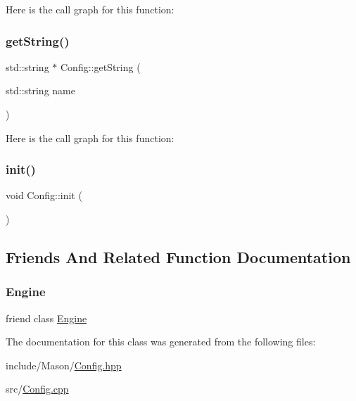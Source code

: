 Here is the call graph for this function\+:
\hypertarget{class_mason_1_1_config_abc367cc6194d049807fab3ff684996e3}{}\label{class_mason_1_1_config_abc367cc6194d049807fab3ff684996e3} 
\subsubsection{\texorpdfstring{get\+String()}{getString()}}
{\footnotesize\ttfamily std\+::string $\ast$ Config\+::get\+String (\begin{DoxyParamCaption}\item[{std\+::string}]{name }\end{DoxyParamCaption})\hspace{0.3cm}{\ttfamily [static]}}

Here is the call graph for this function\+:
\hypertarget{class_mason_1_1_config_a91bcb187ed95ec673137e413a4d77203}{}\label{class_mason_1_1_config_a91bcb187ed95ec673137e413a4d77203} 
\subsubsection{\texorpdfstring{init()}{init()}}
{\footnotesize\ttfamily void Config\+::init (\begin{DoxyParamCaption}{ }\end{DoxyParamCaption})\hspace{0.3cm}{\ttfamily [static]}}



\subsection{Friends And Related Function Documentation}
\hypertarget{class_mason_1_1_config_a3e1914489e4bed4f9f23cdeab34a43dc}{}\label{class_mason_1_1_config_a3e1914489e4bed4f9f23cdeab34a43dc} 
\subsubsection{\texorpdfstring{Engine}{Engine}}
{\footnotesize\ttfamily friend class \hyperlink{class_mason_1_1_engine}{Engine}\hspace{0.3cm}{\ttfamily [friend]}}



The documentation for this class was generated from the following files\+:\begin{DoxyCompactItemize}
\item 
include/\+Mason/\hyperlink{_config_8hpp}{Config.\+hpp}\item 
src/\hyperlink{_config_8cpp}{Config.\+cpp}\end{DoxyCompactItemize}
